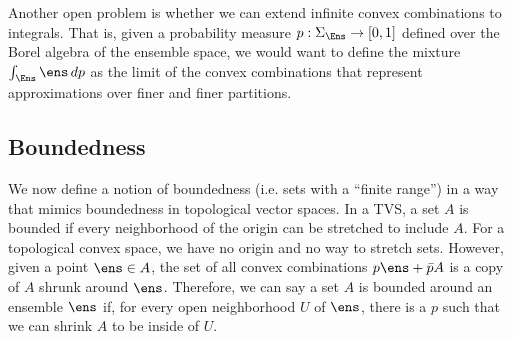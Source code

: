 Another open problem is whether we can extend infinite convex combinations to integrals. That is, given a probability measure $p : \Sigma_{\Ens} \to [0,1]$ defined over the Borel algebra of the ensemble space, we would want to define the mixture $\int_{\Ens} \ens \, dp$ as the limit of the convex combinations that represent approximations over finer and finer partitions. 

\subsection{Boundedness}

We now define a notion of boundedness (i.e. sets with a ``finite range'') in a way that mimics boundedness in topological vector spaces. In a TVS, a set $A$ is bounded if every neighborhood of the origin can be stretched to include $A$. For a topological convex space, we have no origin and no way to stretch sets. However, given a point $\ens \in A$, the set of all convex combinations $p \ens + \bar{p} A$ is a copy of $A$ shrunk around $\ens$. Therefore, we can say a set $A$ is bounded around an ensemble $\ens$ if, for every open neighborhood $U$ of $\ens$, there is a $p$ such that we can shrink $A$ to be inside of $U$.

